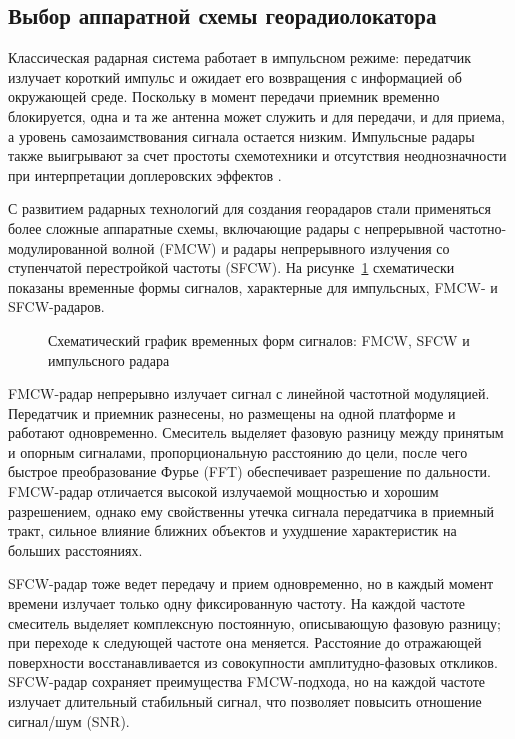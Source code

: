 \subsection{Выбор аппаратной схемы георадиолокатора}

Классическая радарная система работает в импульсном режиме: передатчик излучает короткий импульс и ожидает его возвращения с информацией об окружающей среде. Поскольку в момент передачи приемник временно блокируется, одна и та же антенна может служить и для передачи, и для приема, а уровень самозаимствования сигнала остается низким. Импульсные радары также выигрывают за счет простоты схемотехники и отсутствия неоднозначности при интерпретации доплеровских эффектов \cite{noon1996stepped}.

С развитием радарных технологий для создания георадаров стали применяться более сложные аппаратные схемы, включающие радары с непрерывной частотно-модулированной волной (FMCW) и радары непрерывного излучения со ступенчатой перестройкой частоты (SFCW). На рисунке~\ref{fig:radar-waveforms-placeholder} схематически показаны временные формы сигналов, характерные для импульсных, FMCW- и SFCW-радаров.

\begin{figure}[H]
    \centering
    \caption{Схематический график временных форм сигналов: FMCW, SFCW и импульсного радара}
    \label{fig:radar-waveforms-placeholder}
\end{figure}

FMCW-радар непрерывно излучает сигнал с линейной частотной модуляцией. Передатчик и приемник разнесены, но размещены на одной платформе и работают одновременно. Смеситель выделяет фазовую разницу между принятым и опорным сигналами, пропорциональную расстоянию до цели, после чего быстрое преобразование Фурье (FFT) обеспечивает разрешение по дальности. FMCW-радар отличается высокой излучаемой мощностью и хорошим разрешением, однако ему свойственны утечка сигнала передатчика в приемный тракт, сильное влияние ближних объектов и ухудшение характеристик на больших расстояниях.

SFCW-радар тоже ведет передачу и прием одновременно, но в каждый момент времени излучает только одну фиксированную частоту. На каждой частоте смеситель выделяет комплексную постоянную, описывающую фазовую разницу; при переходе к следующей частоте она меняется. Расстояние до отражающей поверхности восстанавливается из совокупности амплитудно-фазовых откликов. SFCW-радар сохраняет преимущества FMCW-подхода, но на каждой частоте излучает длительный стабильный сигнал, что позволяет повысить отношение сигнал/шум (SNR).

